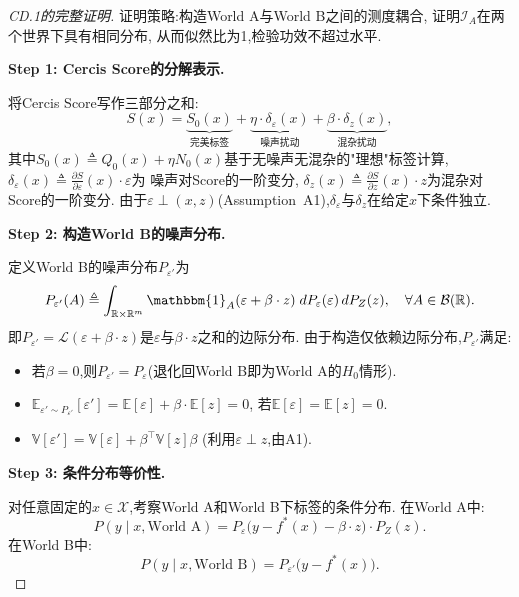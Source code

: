 \documentclass[12pt,a4paper]{article}
\newcommand{\R}{\mathbb{R}}
\newcommand{\E}{\mathbb{E}}
\newcommand{\V}{\mathbb{V}}
\newcommand{\cX}{\mathcal{X}}
\newcommand{\cI}{\mathcal{I}}
\newcommand{\cB}{\mathcal{B}}
\newcommand{\Law}{\mathcal{L}}
\newcommand{\defeq}{\triangleq}
\begin{document}
\begin{proof}[CD.1的完整证明]
    证明策略:构造World A与World B之间的测度耦合,
    证明$\cI_A$在两个世界下具有相同分布,
    从而似然比为1,检验功效不超过水平.

    \textbf{Step 1: Cercis Score的分解表示.}

    将Cercis Score写作三部分之和:
    \begin{equation}\label{eq:s-decomp-formal}
        S(x) = \underbrace{S_0(x)}_{\text{完美标签}}
        + \underbrace{\eta \cdot \delta_\varepsilon(x)}_{\text{噪声扰动}}
        + \underbrace{\beta \cdot \delta_z(x)}_{\text{混杂扰动}},
    \end{equation}
    其中$S_0(x) \defeq Q_0(x) + \eta N_0(x)$基于无噪声无混杂的"理想"标签计算,
    $\delta_\varepsilon(x) \defeq \frac{\partial S}{\partial \varepsilon}(x) \cdot \varepsilon$为
    噪声对Score的一阶变分,
    $\delta_z(x) \defeq \frac{\partial S}{\partial z}(x) \cdot z$为混杂对Score的一阶变分.
    由于$\varepsilon \perp (x,z)$(Assumption~A1),$\delta_\varepsilon$与$\delta_z$在给定$x$下条件独立.

    \textbf{Step 2: 构造World B的噪声分布.}

    定义World B的噪声分布$P_{\varepsilon'}$为
    \begin{equation}\label{eq:construct-pe}
        P_{\varepsilon'}(A) \defeq \int_{\R \times \R^m}
        \mathbbm{1}_A(\varepsilon + \beta\cdot z)\; dP_\varepsilon(\varepsilon)\, dP_Z(z),\quad
        \forall A \in \cB(\R).
    \end{equation}
    即$P_{\varepsilon'} = \Law(\varepsilon + \beta\cdot z)$是$\varepsilon$与$\beta\cdot z$之和的边际分布.
    由于构造仅依赖边际分布,$P_{\varepsilon'}$满足:
    \begin{itemize}
        \item 若$\beta = 0$,则$P_{\varepsilon'} = P_\varepsilon$(退化回World B即为World A的$H_0$情形).
        \item $\E_{\varepsilon'\sim P_{\varepsilon'}}[\varepsilon'] = \E[\varepsilon] + \beta\cdot\E[z] = 0$,
              若$\E[\varepsilon] = \E[z] = 0$.
        \item $\V[\varepsilon'] = \V[\varepsilon] + \beta^\top \V[z]\beta$
              (利用$\varepsilon \perp z$,由A1).
    \end{itemize}

    \textbf{Step 3: 条件分布等价性.}

    对任意固定的$x \in \cX$,考察World A和World B下标签的条件分布.
    在World A中:
    \begin{equation}
        P(y \mid x, \text{World A}) = P_\varepsilon\big(y - f^*(x) - \beta\cdot z\big) \cdot P_Z(z).
    \end{equation}
    在World B中:
    \begin{equation}
        P(y \mid x, \text{World B}) = P_{\varepsilon'}\big(y - f^*(x)\big).
    \end{equation}


\end{proof}
\end{document}
